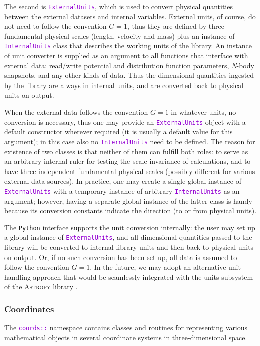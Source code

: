 \documentclass[12pt]{article}
\newcommand{\Nbody}{\textsl{N}-body\xspace}
\newcommand{\Python}{\texttt{Python}\xspace}
\newcommand{\ttt}[1]{\textcolor{darkviolet}{\texttt{#1}}}
\begin{document}
The second is \ttt{ExternalUnits}, which is used to convert physical quantities between the external datasets and internal variables. External units, of course, do not need to follow the convention $G=1$, thus they are defined by three fundamental physical scales (length, velocity and mass) plus an instance of \ttt{InternalUnits} class that describes the working units of the library. An instance of unit converter is supplied as an argument to all functions that interface with external data: read/write potential and distribution function parameters, \Nbody snapshots, and any other kinds of data. Thus the dimensional quantities ingested by the library are always in internal units, and are converted back to physical units on output.

When the external data follows the convention $G=1$ in whatever units, no conversion is necessary, thus one may provide an \ttt{ExternalUnits} object with a default constructor wherever required (it is usually a default value for this argument); in this case also no \ttt{InternalUnits} need to be defined. The reason for existence of two classes is that neither of them can fulfill both roles: to serve as an arbitrary internal ruler for testing the scale-invariance of calculations, and to have three independent fundamental physical scales (possibly different for various external data sources). In practice, one may create a single global instance of \ttt{ExternalUnits} with a temporary instance of arbitrary \ttt{InternalUnits} as an argument; however, having a separate global instance of the latter class is handy because its conversion constants indicate the direction (to or from physical units).

The \Python interface supports the unit conversion internally: the user may set up a global instance of \ttt{ExternalUnits}, and all dimensional quantities passed to the library will be converted to internal library units and then back to physical units on output. Or, if no such conversion has been set up, all data is assumed to follow the convention $G=1$. In the future, we may adopt an alternative unit handling approach that would be seamlessly integrated with the units subsystem of the \textsc{Astropy} library \cite{Astropy}.


\subsubsection{Coordinates}  \label{sec:Coords}
The \ttt{coords::} namespace contains classes and routines for representing various mathematical objects in several coordinate systems in three-dimensional space.
\end{document}
